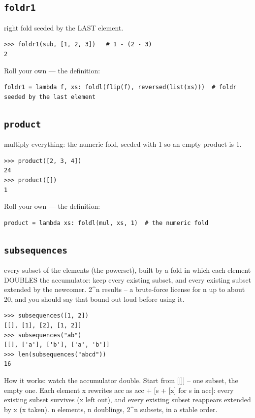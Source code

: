 \documentclass[10pt,letterpaper]{book}
\begin{document}
\subsection{\texttt{foldr1}}\label{def:foldr1}
right fold seeded by the LAST element.
\begin{lstlisting}[style=ex]
>>> foldr1(sub, [1, 2, 3])   # 1 - (2 - 3)
2
\end{lstlisting}

Roll your own --- the definition:

\begin{lstlisting}[style=ex]
foldr1 = lambda f, xs: foldl(flip(f), reversed(list(xs)))  # foldr seeded by the last element
\end{lstlisting}

\subsection{\texttt{product}}\label{def:product}
multiply everything: the numeric fold, seeded with 1 so an empty product is 1.
\begin{lstlisting}[style=ex]
>>> product([2, 3, 4])
24
>>> product([])
1
\end{lstlisting}

Roll your own --- the definition:

\begin{lstlisting}[style=ex]
product = lambda xs: foldl(mul, xs, 1)  # the numeric fold
\end{lstlisting}
\subsection{\texttt{subsequences}}\label{def:subsequences}
every subset of the elements (the powerset), built by a fold in which each element DOUBLES the accumulator: keep every existing subset, and every existing subset extended by the newcomer. 2\^{}n results -- a brute-force license for n up to about 20, and you should say that bound out loud before using it.
\begin{lstlisting}[style=ex]
>>> subsequences([1, 2])
[[], [1], [2], [1, 2]]
>>> subsequences("ab")
[[], ['a'], ['b'], ['a', 'b']]
>>> len(subsequences("abcd"))
16
\end{lstlisting}

How it works: watch the accumulator double. Start from [[]] -- one subset, the empty one. Each element x rewrites acc as acc + [s + [x] for s in acc]: every existing subset survives (x left out), and every existing subset reappears extended by x (x taken). n elements, n doublings, 2\^{}n subsets, in a stable order.
\end{document}
